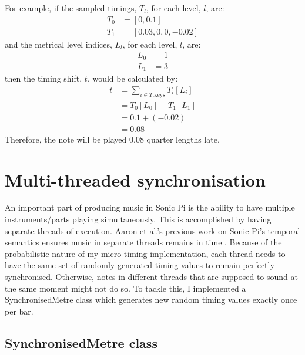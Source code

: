 \documentclass[12pt,twoside,openright]{report}
\begin{document}
For example, if the sampled timings, $T_l$, for each level, $l$, are:
\begin{equation*}
    \begin{split}
        T_0 &= [0,0.1] \\
        T_1 &= [0.03,0,0,-0.02]
    \end{split}
\end{equation*}
and the metrical level indices, $L_l$, for each level, $l$, are:
\begin{equation*}
    \begin{split}
        L_0 &= 1 \\
        L_1 &= 3
    \end{split}
\end{equation*}
then the timing shift, $t$, would be calculated by:
\begin{equation*}
    \begin{split}
        t &= \sum_{i \in T.\mathrm{keys}} T_i[L_i] \\
        &=T_0[L_0]+T_1[L_1] \\
        &=0.1+(-0.02) \\
        &=0.08
    \end{split}
\end{equation*}
Therefore, the note will be played 0.08 quarter lengths late.



\section{Multi-threaded synchronisation} \label{multi-threaded_synchronisation}

An important part of producing music in Sonic Pi is the ability to have multiple
instruments/parts playing simultaneously. This is accomplished by having
separate threads of execution. Aaron et al.'s previous work on Sonic Pi's
temporal semantics ensures music in separate threads remains in time \cite{aaron2014}.
Because of the probabilistic nature of my micro-timing implementation, each
thread needs to have the same set of randomly generated timing values to remain
perfectly synchronised. Otherwise, notes in different threads that are supposed
to sound at the same moment might not do so. To tackle this, I implemented a
SynchronisedMetre class which generates new random timing values exactly once
per bar.


\subsection{SynchronisedMetre class} \label{synchronised_metre}
\end{document}
